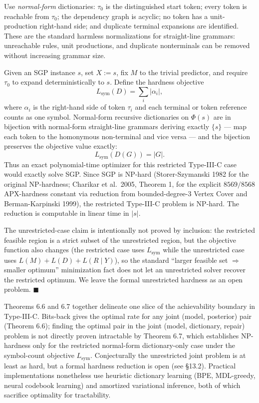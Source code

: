 \documentclass[
]{article}
\begin{document}
Use \emph{normal-form} dictionaries: $\tau_0$ is the distinguished
start token; every token is reachable from $\tau_0$; the dependency
graph is acyclic; no token has a unit-production right-hand side; and
duplicate terminal expansions are identified. These are the standard
harmless normalizations for straight-line grammars: unreachable
rules, unit productions, and duplicate nonterminals can be removed
without increasing grammar size.

Given an SGP instance $s$, set $X := s$, fix $M$ to the trivial
predictor, and require $\tau_0$ to expand deterministically to $s$.
Define the hardness objective
\[
L_{\mathrm{sym}}(D) = \sum_i |\alpha_i|,
\]
where $\alpha_i$ is the right-hand side of token $\tau_i$ and each
terminal or token reference counts as one symbol. Normal-form
recursive dictionaries on $\Phi(s)$ are in bijection with normal-form
straight-line grammars deriving exactly $\{s\}$ --- map each token to
the homonymous non-terminal and vice versa --- and the bijection
preserves the objective value exactly:
\[
L_{\mathrm{sym}}(D(G)) = |G|.
\]
Thus an exact polynomial-time optimizer for this restricted
Type-III-C case would exactly solve SGP. Since SGP is NP-hard
(Storer-Szymanski 1982 for the original NP-hardness; Charikar et
al.\ 2005, Theorem 1, for the explicit $8569/8568$ APX-hardness
constant via reduction from bounded-degree-3 Vertex Cover and
Berman-Karpinski 1999), the restricted Type-III-C problem is
NP-hard. The reduction is computable in linear time in $|s|$.

The unrestricted-case claim is intentionally not proved by inclusion:
the restricted feasible region is a strict subset of the unrestricted
region, but the objective function also changes (the restricted case
uses $L_{\mathrm{sym}}$ while the unrestricted case uses
$L(M) + L(D) + L(R\mid Y)$), so the standard ``larger feasible set
$\Rightarrow$ smaller optimum'' minimization fact does not let an
unrestricted solver recover the restricted optimum. We leave the
formal unrestricted hardness as an open problem.
\hfill$\blacksquare$

Theorems 6.6 and 6.7 together delineate one slice of the
achievability boundary in Type-III-C. Bits-back gives the optimal
rate for any joint (model, posterior) pair (Theorem 6.6); finding
the optimal pair in the joint (model, dictionary, repair) problem
is not directly proven intractable by Theorem 6.7, which establishes
NP-hardness only for the restricted normal-form dictionary-only
case under the symbol-count objective $L_{\mathrm{sym}}$.
Conjecturally the unrestricted joint problem is at least as hard,
but a formal hardness reduction is open (see §13.2). Practical
implementations nonetheless use heuristic dictionary learning (BPE,
MDL-greedy, neural codebook learning) and amortized variational
inference, both of which sacrifice optimality for tractability.
\end{document}
